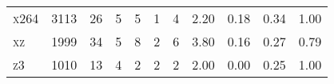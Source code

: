 \begin{tabular}{lrrrrrrrrrr}
             \textsc{x264} &             3113 &                                    26 &                5 &                                         5 &                         1 &                         4 &                                  2.20 &            0.18 &                        0.34 &                              1.00 \\
               \textsc{xz} &             1999 &                                    34 &                5 &                                         8 &                         2 &                         6 &                                  3.80 &            0.16 &                        0.27 &                              0.79 \\
               \textsc{z3} &             1010 &                                    13 &                4 &                                         2 &                         2 &                         2 &                                  2.00 &            0.00 &                        0.25 &                              1.00 \\
\bottomrule
\end{tabular}
